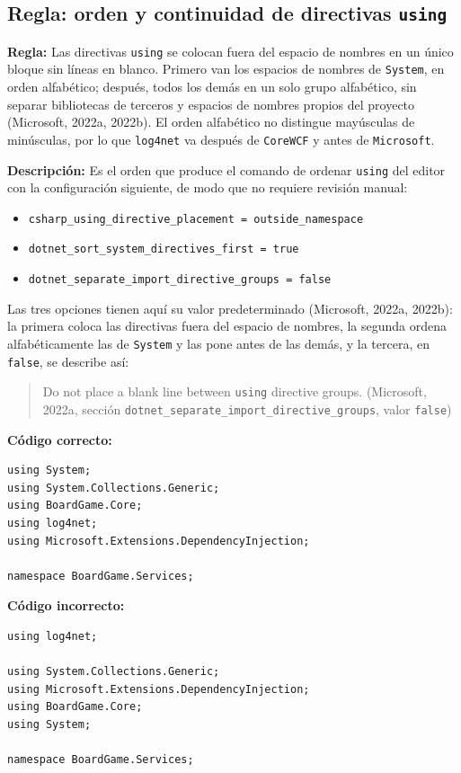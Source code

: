\subsection{Regla: orden y continuidad de directivas \texttt{using}}

\textbf{Regla:} Las directivas \texttt{using} se colocan fuera del espacio de nombres en un único bloque sin líneas en blanco. Primero van los espacios de nombres de \texttt{System}, en orden alfabético; después, todos los demás en un solo grupo alfabético, sin separar bibliotecas de terceros y espacios de nombres propios del proyecto (Microsoft, 2022a, 2022b). El orden alfabético no distingue mayúsculas de minúsculas, por lo que \texttt{log4net} va después de \texttt{CoreWCF} y antes de \texttt{Microsoft}.

\textbf{Descripción:} Es el orden que produce el comando de ordenar \texttt{using} del editor con la configuración siguiente, de modo que no requiere revisión manual:

\begin{itemize}
  \item \texttt{csharp\_using\_directive\_placement = outside\_namespace}
  \item \texttt{dotnet\_sort\_system\_directives\_first = true}
  \item \texttt{dotnet\_separate\_import\_directive\_groups = false}
\end{itemize}

\noindent Las tres opciones tienen aquí su valor predeterminado (Microsoft, 2022a, 2022b): la primera coloca las directivas fuera del espacio de nombres, la segunda ordena alfabéticamente las de \texttt{System} y las pone antes de las demás, y la tercera, en \texttt{false}, se describe así:
\begin{quote}
Do not place a blank line between \texttt{using} directive groups. (Microsoft, 2022a, sección \texttt{dotnet\_separate\_\allowbreak import\_\allowbreak directive\_\allowbreak groups}, valor \texttt{false})
\end{quote}

\textbf{Código correcto:}
\begin{lstlisting}[style=csharpstyle]
using System;
using System.Collections.Generic;
using BoardGame.Core;
using log4net;
using Microsoft.Extensions.DependencyInjection;

namespace BoardGame.Services;
\end{lstlisting}

\textbf{Código incorrecto:}
\begin{lstlisting}[style=csharpstyle]
using log4net;

using System.Collections.Generic;
using Microsoft.Extensions.DependencyInjection;
using BoardGame.Core;
using System;

namespace BoardGame.Services;
\end{lstlisting}

